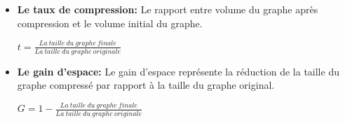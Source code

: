 				\begin{itemize}
					\item \textbf{Le taux de compression:} Le rapport entre volume du graphe après compression et le volume initial du graphe.
					\begin{center}
				$
				t = \frac{La\ taille\ du\ graphe\ finale}{La\ taille\ du\ graphe\ originale }
				$
				\end{center}
					\item \textbf{Le gain d'espace: }Le gain d'espace représente la réduction de la taille du graphe compressé par rapport à la taille du graphe original.
					
					\begin{center}
				$
				G = 1 - \frac{La\ taille\ du\ graphe\ finale}{La\ taille\ du\ graphe\ originale }
				$
				\end{center}
					
					
				\end{itemize}
				
				
